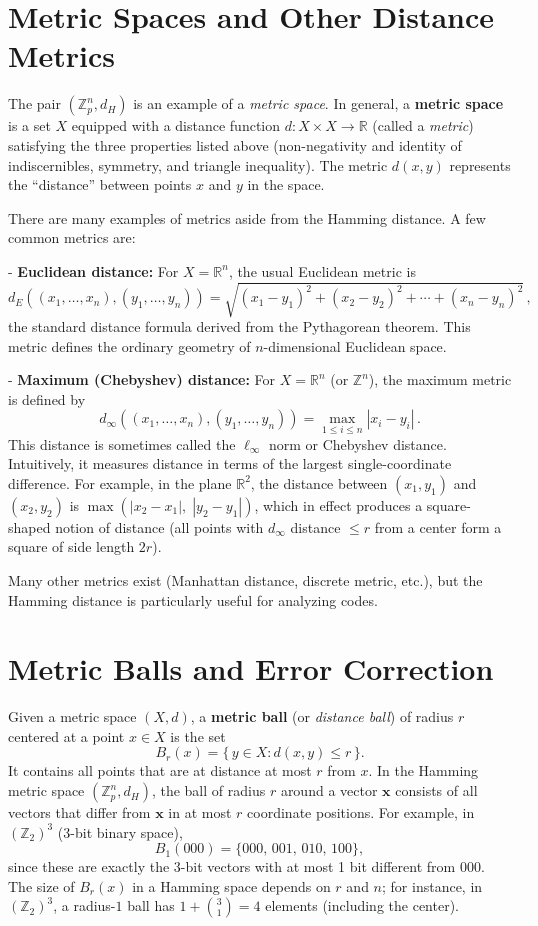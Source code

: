 \documentclass[docmute]{article}
\begin{document}
\section{Metric Spaces and Other Distance Metrics}

The pair $(\mathbb{Z}_p^n, d_H)$ is an example of a \emph{metric space}. In general, a \textbf{metric space} is a set $X$ equipped with a distance function $d: X \times X \to \mathbb{R}$ (called a \emph{metric}) satisfying the three properties listed above (non-negativity and identity of indiscernibles, symmetry, and triangle inequality). The metric $d(x,y)$ represents the “distance” between points $x$ and $y$ in the space.

There are many examples of metrics aside from the Hamming distance. A few common metrics are:

- \textbf{Euclidean distance:} For $X = \mathbb{R}^n$, the usual Euclidean metric is 
  \[
  d_E((x_1,\ldots,x_n), (y_1,\ldots,y_n)) = \sqrt{(x_1 - y_1)^2 + (x_2 - y_2)^2 + \cdots + (x_n - y_n)^2}\,,
  \] 
  the standard distance formula derived from the Pythagorean theorem. This metric defines the ordinary geometry of $n$-dimensional Euclidean space.

- \textbf{Maximum (Chebyshev) distance:} For $X = \mathbb{R}^n$ (or $\mathbb{Z}^n$), the maximum metric is defined by 
  \[
  d_\infty((x_1,\ldots,x_n), (y_1,\ldots,y_n)) = \max_{1 \le i \le n} |x_i - y_i|\,.
  \] 
  This distance is sometimes called the $\ell_\infty$ norm or Chebyshev distance. Intuitively, it measures distance in terms of the largest single-coordinate difference. For example, in the plane $\mathbb{R}^2$, the distance between $(x_1,y_1)$ and $(x_2,y_2)$ is $\max(|x_2-x_1|,\;|y_2-y_1|)$, which in effect produces a square-shaped notion of distance (all points with $d_\infty$ distance $\le r$ from a center form a square of side length $2r$).

Many other metrics exist (Manhattan distance, discrete metric, etc.), but the Hamming distance is particularly useful for analyzing codes. 


\section{Metric Balls and Error Correction}

Given a metric space $(X,d)$, a \textbf{metric ball} (or \emph{distance ball}) of radius $r$ centered at a point $x \in X$ is the set 
\[ B_r(x) = \{\,y \in X : d(x,y) \le r\,\}. \] 
It contains all points that are at distance at most $r$ from $x$. In the Hamming metric space $(\mathbb{Z}_p^n, d_H)$, the ball of radius $r$ around a vector $\mathbf{x}$ consists of all vectors that differ from $\mathbf{x}$ in at most $r$ coordinate positions. For example, in $(\mathbb{Z}_2)^3$ (3-bit binary space), 
\[ B_1(000) = \{000,\,001,\,010,\,100\}, \] 
since these are exactly the 3-bit vectors with at most 1 bit different from $000$. The size of $B_r(x)$ in a Hamming space depends on $r$ and $n$; for instance, in $(\mathbb{Z}_2)^3$, a radius-$1$ ball has $1 + \binom{3}{1} = 4$ elements (including the center).
\end{document}
